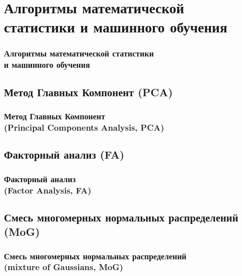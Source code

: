\documentclass{beamer}
\begin{document}
\section{Алгоритмы математической статистики и машинного обучения}

\begin{frame}
\frametitle{Алгоритмы математической статистики\\и машинного обучения}

\end{frame}

\subsection{Метод Главных Компонент (PCA)}

\begin{frame}
\frametitle{Метод Главных Компонент\\(Principal Components Analysis, PCA)}

\end{frame}

\subsection{Факторный анализ (FA)}

\begin{frame}
\frametitle{Факторный анализ\\(Factor Analysis, FA)}

\end{frame}

\subsection{Смесь многомерных нормальных распределений (MoG)}

\begin{frame}
\frametitle{Смесь многомерных нормальных распределений\\(mixture of Gaussians, MoG)}

\end{frame}
\end{document}

